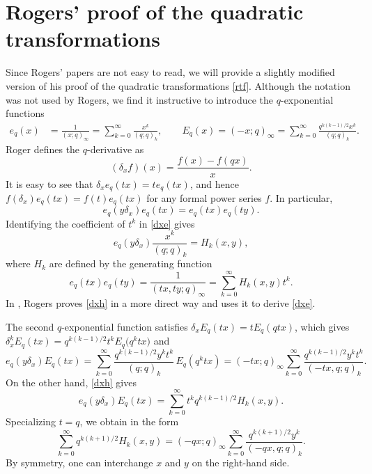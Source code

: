 \section{Rogers' proof of the quadratic transformations}\label{rpss}

Since Rogers' papers are not easy to read, we will provide a slightly modified
version of his proof of the quadratic transformations \eqref{rtf}.
Although the notation was not used by Rogers, we find it instructive to introduce the $q$-exponential functions
\begin{align*}
e_q(x)&=\frac 1{(x;q)_\infty}=\sum_{k=0}^\infty\frac{x^k}{(q;q)_k},\qquad
E_q(x)=(-x;q)_\infty=\sum_{k=0}^\infty\frac{q^{k(k-1)/2}x^k}{(q;q)_k}.
\end{align*}
Roger defines the $q$-derivative as
\begin{equation*}(\delta_x f)(x)=\frac{f(x)-f(qx)}{x}. \end{equation*}
It is easy to see that $\delta_x e_q(tx)=t e_q(tx)$,
 and hence $f(\delta_x)e_q(tx)=f(t)e_q(tx)$ for any formal power series $f$. In particular,
\begin{equation}\label{dxe}
e_q(y\delta_x)e_q(tx)=e_q(tx)e_q(ty).\end{equation}
Identifying the coefficient of $t^k$ in \eqref{dxe} gives
\begin{equation}\label{dxh}e_q(y\delta_x)\frac{x^k}{(q;q)_k}=H_k(x,y),\end{equation}
where $H_k$ are defined by the generating function
\begin{equation}\label{eeh}e_q(tx)e_q(ty)= \frac 1{(tx,ty;q)_\infty}=\sum_{k=0}^\infty H_k(x,y)t^k.\end{equation}
In \cite{r1}, Rogers proves \eqref{dxh} in a more direct way and uses it to derive \eqref{dxe}.

The second $q$-exponential function satisfies $\delta_x E_q(tx)=t E_q(qtx)$,
which gives $\delta_x^k E_q(tx)=q^{k(k-1)/2}t^kE_q\bigl(q^ktx\bigr)$ and
\begin{equation*} e_q(y\delta_x)E_q(tx)=\sum_{k=0}^\infty\frac{q^{k(k-1)/2}y^kt^k}{(q;q)_k}\,E_q(q^ktx)
=(-tx;q)_\infty\sum_{k=0}^\infty\frac{q^{k(k-1)/2}y^kt^k}{(-tx,q;q)_k}.\end{equation*}
On the other hand, \eqref{dxh} gives
\begin{equation*}e_q(y\delta_x)E_q(tx)=\sum_{k=0}^\infty t^kq^{k(k-1)/2} H_k(x,y). \end{equation*}
Specializing $t=q$, we obtain \cite[Section~6, equation~(1)]{r2} in the form
\begin{equation}\label{rhi}\sum_{k=0}^\infty q^{k(k+1)/2} H_k(x,y)=(-qx;q)_\infty\sum_{k=0}^\infty\frac{q^{k(k+1)/2}y^k}{(-qx,q;q)_k}.
\end{equation}
By symmetry, one can interchange $x$ and $y$ on the right-hand side.


